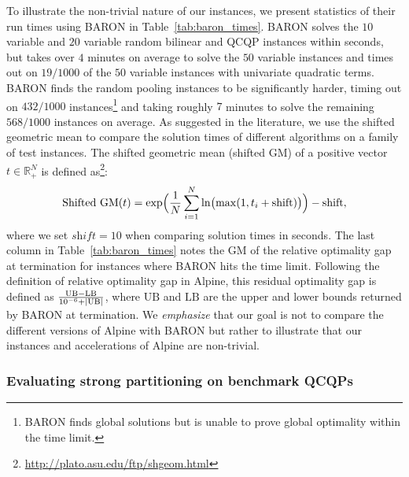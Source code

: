 \documentclass{article}
\DeclarePairedDelimiter\abs{\lvert}{\rvert}%
\newcommand{\R}{\mathbb{R}}
\begin{document}
To illustrate the non-trivial nature of our instances, we present statistics of their run times using BARON in Table~\ref{tab:baron_times}.
BARON solves the $10$ variable and $20$ variable random bilinear and QCQP instances within seconds, but takes over $4$ minutes on average to solve the $50$ variable instances and times out on $19/1000$ of the $50$ variable instances with univariate quadratic terms.
BARON finds the random pooling instances to be significantly harder, timing out on $432/1000$ instances\footnote{BARON finds global solutions but is unable to prove global optimality within the time limit.} and taking roughly $7$ minutes to solve the remaining $568/1000$ instances on average.
As suggested in the literature, we use the shifted geometric mean to compare the solution times of different algorithms on a family of test instances.
The shifted geometric mean (shifted GM) of a positive vector $t \in \R^N_+$ is defined as\footnote{\url{http://plato.asu.edu/ftp/shgeom.html}}:
\[
\text{Shifted GM}(t) = \exp\Bigl(\frac{1}{N}\sum_{i=1}^{N} \ln\bigl(\max(1, t_i + \text{shift})\bigr) \Bigr) - \text{shift},
\]
where we set $\textit{shift} = 10$ when comparing solution times in seconds.
The last column in Table~\ref{tab:baron_times} notes the GM of the relative optimality gap at termination for instances where BARON hits the time limit.
Following the definition of relative optimality gap in Alpine, this residual optimality gap is defined as $\frac{\text{UB} - \text{LB}}{10^{-6} + \abs{\text{UB}}}$, where $\text{UB}$ and $\text{LB}$ are the upper and lower bounds returned by BARON at termination. 
We \textit{emphasize} that our goal is not to compare the different versions of Alpine with BARON but rather to illustrate that our instances and accelerations of Alpine are non-trivial.







\subsubsection{Evaluating strong partitioning on benchmark QCQPs}
\end{document}
